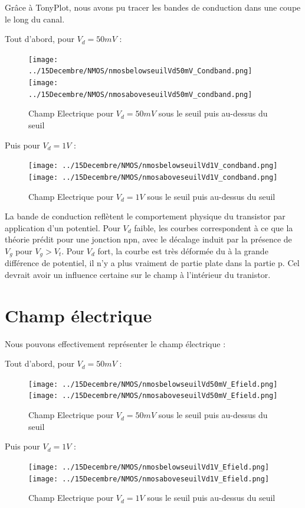 \documentclass[a4paper,11pt]{report}
\begin{document}
Grâce à TonyPlot, nous avons pu tracer les bandes de conduction dans une coupe le long du canal.

Tout d'abord, pour $V_d=50mV$ :
\begin{figure}[H]
\centering
\texttt{[image: ../15Decembre/NMOS/nmosbelowseuilVd50mV\_Condband.png]} 
\texttt{[image: ../15Decembre/NMOS/nmosaboveseuilVd50mV\_condband.png]}
\caption{Champ Electrique pour $V_d=50mV$ sous le seuil puis au-dessus du seuil}
\end{figure}

Puis pour $V_d=1V$ :

\begin{figure}[H]
\centering
\texttt{[image: ../15Decembre/NMOS/nmosbelowseuilVd1V\_condband.png]} 
\texttt{[image: ../15Decembre/NMOS/nmosaboveseuilVd1V\_condband.png]}
\caption{Champ Electrique pour $V_d=1V$ sous le seuil puis au-dessus du seuil}
\end{figure}

La bande de conduction reflètent le comportement physique du transistor par application d'un potentiel. Pour $V_d$ faible, les courbes correspondent à ce que la théorie prédit pour une jonction npn, avec le décalage induit par la présence de $V_g$ pour $V_g>V_t$. Pour $V_d$ fort, la courbe est très déformée du à la grande différence de potentiel, il n'y a plus vraiment de partie plate dans la partie p. Cel devrait avoir un influence certaine sur le champ à l'intérieur du tranistor.

\section{Champ électrique}

Nous pouvons effectivement représenter le champ électrique :

Tout d'abord, pour $V_d=50mV$ :
\begin{figure}[H]
\centering
\texttt{[image: ../15Decembre/NMOS/nmosbelowseuilVd50mV\_Efield.png]} 
\texttt{[image: ../15Decembre/NMOS/nmosaboveseuilVd50mV\_Efield.png]}
\caption{Champ Electrique pour $V_d=50mV$ sous le seuil puis au-dessus du seuil}
\end{figure}

Puis pour $V_d=1V$ :

\begin{figure}[H]
\centering
\texttt{[image: ../15Decembre/NMOS/nmosbelowseuilVd1V\_Efield.png]} 
\texttt{[image: ../15Decembre/NMOS/nmosaboveseuilVd1V\_Efield.png]}
\caption{Champ Electrique pour $V_d=1V$ sous le seuil puis au-dessus du seuil}
\end{figure}
\end{document}
